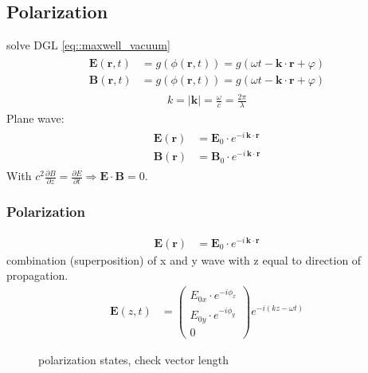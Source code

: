 \subsection{Polarization}
% 
solve DGL \ref{eq::maxwell_vacuum}
% 
\begin{align}
\begin{split} \label{eq::dgl_solution}
   \mathbf{E}( \mathbf{r}, t ) &= g(\phi( \mathbf{r}, t )) = g( \omega t - \mathbf{k} \cdot \mathbf{r} + \varphi)\\
   \mathbf{B}( \mathbf{r}, t ) &= g(\phi( \mathbf{r}, t )) = g( \omega t - \mathbf{k} \cdot \mathbf{r} + \varphi )
\end{split}
\end{align}
% 
\begin{align}
k = \mathopen| \mathbf{k} \mathclose| = \frac{\omega}{c} =  \frac{2 \pi}{\lambda}
\end{align}
% 
Plane wave:
\begin{align}
\begin{split} \label{eq::plane_wave}
\mathbf{E}(\mathbf{r}) &= \mathbf{E}_0 \cdot e^{ -i \, \mathbf{k} \cdot \mathbf{r} }\\
 \mathbf{B}(\mathbf{r}) &= \mathbf{B}_0 \cdot e^{ -i \, \mathbf{k} \cdot \mathbf{r} }
\end{split}
\end{align}
% 
With $c^2  \frac{\partial B} {\partial z} = \frac{\partial E}{\partial t} \Rightarrow \mathbf{E} \cdot \mathbf{B} = 0$.
% 
\subsubsection{Polarization}
% 
\begin{align}
\mathbf{E}(\mathbf{r}) &= \mathbf{E}_0 \cdot e^{ -i \, \mathbf{k} \cdot \mathbf{r}}
\end{align}
% 
combination (superposition) of x and y wave with z equal to direction of propagation.
\begin{align}
\mathbf{E}(z,t) &= \begin{pmatrix} E_{0x} \cdot e^{ -i \phi_x } \\ E_{0y} \cdot e^{ -i \phi_y } \\ 0 \end{pmatrix}
e^{ -i (kz - \omega t)}
\end{align}
%
\begin{figure}[!tb]
\centering

\caption{polarization states, check vector length} 
\end{figure}
%
